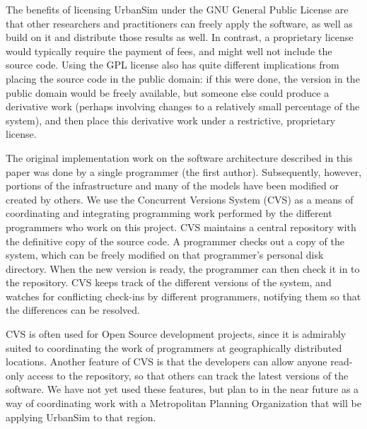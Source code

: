 The benefits of licensing UrbanSim under the GNU General Public License are
that other researchers and practitioners can freely apply the software, as
well as build on it and distribute those results as well.  In contrast, a
proprietary license would typically require the payment of fees, and might
well not include the source code.  Using the GPL license also has quite
different implications from placing the source code in the public domain:
if this were done, the version in the public domain would be freely
available, but someone else could produce a derivative work (perhaps involving
changes to a relatively small percentage of the system), and then place
this derivative work under a restrictive, proprietary license.

The original implementation work on the software architecture
described in this paper was done by a single programmer (the first
author). Subsequently, however, portions of the infrastructure and
many of the models have been modified or created by others.  We
use the Concurrent Versions System (CVS)
\citep{cederqvist-cvs-2000} as a means of coordinating and
integrating programming work performed by the different
programmers who work on this project.  CVS maintains a central
repository with the definitive copy of the source code.  A
programmer checks out a copy of the system, which can be
freely modified on that programmer's personal disk directory. When
the new version is ready, the programmer can then check it in to
the repository.  CVS keeps track of the different versions of the
system, and watches for conflicting check-ins by different
programmers, notifying them so that the differences can be
resolved.

CVS is often used for Open Source development projects, since it is
admirably suited to coordinating the work of programmers at geographically
distributed locations.  Another feature of CVS is that the developers can
allow anyone read-only access to the repository, so that others can track
the latest versions of the software.  We have not yet used these features,
but plan to in the near future as a way of coordinating work with a
Metropolitan Planning Organization that will be applying UrbanSim to that
region.

